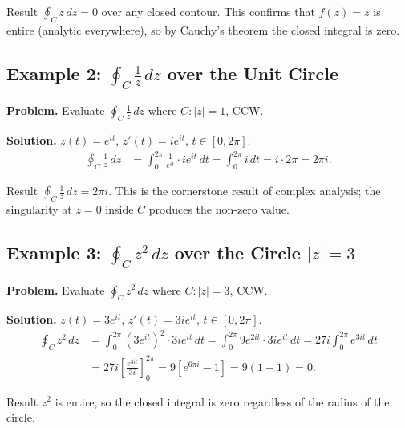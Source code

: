 \documentclass[12pt,a4paper]{article}
\begin{document}
\begin{learnbox}{Result}
$\oint_C z\,dz = 0$ over any closed contour. This confirms that $f(z)=z$ is entire
(analytic everywhere), so by Cauchy's theorem the closed integral is zero.
\end{learnbox}

\subsection*{Example 2: \(\oint_C \frac{1}{z}\,dz\) over the Unit Circle}

\textbf{Problem.} Evaluate $\displaystyle\oint_C \frac{1}{z}\,dz$ where $C : |z|=1$, CCW.

\textbf{Solution.} $z(t)=e^{it}$, $z'(t)=ie^{it}$, $t\in[0,2\pi]$.
\begin{align*}
\oint_C \frac{1}{z}\,dz &= \int_0^{2\pi} \frac{1}{e^{it}} \cdot ie^{it}\,dt
                         = \int_0^{2\pi} i\,dt
                         = i\cdot 2\pi = 2\pi i.
\end{align*}

\begin{learnbox}{Result}
$\oint_C \frac{1}{z}\,dz = 2\pi i$. This is the cornerstone result of complex
analysis; the singularity at $z=0$ inside $C$ produces the non-zero value.
\end{learnbox}

\subsection*{Example 3: \(\oint_C z^2\,dz\) over the Circle $|z|=3$}

\textbf{Problem.} Evaluate $\displaystyle\oint_C z^2\,dz$ where $C : |z|=3$, CCW.

\textbf{Solution.} $z(t)=3e^{it}$, $z'(t)=3ie^{it}$, $t\in[0,2\pi]$.
\begin{align*}
\oint_C z^2\,dz &= \int_0^{2\pi} (3e^{it})^2 \cdot 3ie^{it}\,dt
                = \int_0^{2\pi} 9e^{2it}\cdot 3ie^{it}\,dt
                = 27i\int_0^{2\pi} e^{3it}\,dt \\
                &= 27i\left[\frac{e^{3it}}{3i}\right]_0^{2\pi}
                = 9\left[e^{6\pi i} - 1\right]
                = 9(1-1) = 0.
\end{align*}

\begin{learnbox}{Result}
$z^2$ is entire, so the closed integral is zero regardless of the radius of the circle.
\end{learnbox}
\end{document}
